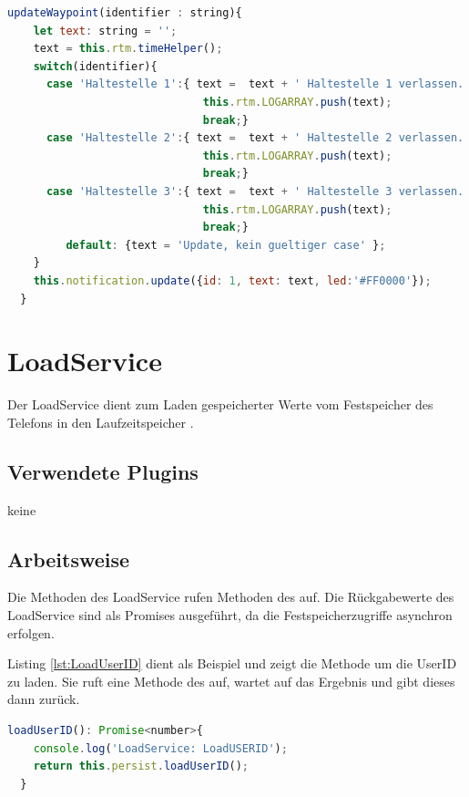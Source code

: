 \begin{lstlisting}[float, language=JavaScript, caption= Update einer Notification bei Verlassen einer Haltestelle , label=lst:UpdateNotification]
updateWaypoint(identifier : string){
    let text: string = '';
    text = this.rtm.timeHelper();
    switch(identifier){
      case 'Haltestelle 1':{ text =  text + ' Haltestelle 1 verlassen.';
                              this.rtm.LOGARRAY.push(text);
                              break;}
      case 'Haltestelle 2':{ text =  text + ' Haltestelle 2 verlassen.';
                              this.rtm.LOGARRAY.push(text);
                              break;}
      case 'Haltestelle 3':{ text =  text + ' Haltestelle 3 verlassen.';
                              this.rtm.LOGARRAY.push(text);
                              break;}
 		 default: {text = 'Update, kein gueltiger case' };
    }
    this.notification.update({id: 1, text: text, led:'#FF0000'});
  }
\end{lstlisting}



\section{LoadService}
\label{srv:LoadService}
Der LoadService dient zum Laden gespeicherter Werte vom Festspeicher des Telefons in den Laufzeitspeicher .
\subsection{Verwendete Plugins}
keine 
\subsection{Arbeitsweise}
Die Methoden des LoadService rufen Methoden des  auf. Die Rückgabewerte des LoadService sind als Promises ausgeführt, da die Festspeicherzugriffe asynchron erfolgen. 

Listing \ref{lst:LoadUserID} dient als Beispiel und zeigt die Methode um die UserID zu laden. Sie ruft eine Methode des  auf, wartet auf das Ergebnis und gibt dieses dann zurück.
  
\begin{lstlisting}[float, language=JavaScript, caption= Laden der UserID , label=lst:LoadUserID]
loadUserID(): Promise<number>{
    console.log('LoadService: LoadUSERID');
    return this.persist.loadUserID();
  }
  \end{lstlisting}
  
